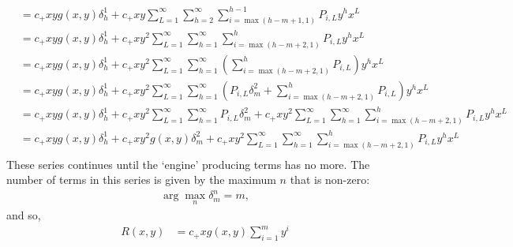 	\begin{align}
		&= c_+xy g(x, y)\delta_h^1 + c_+xy \sum_{L=1}^\infty\sum_{h=2}^\infty\sum_{i=\max(h-m+1, 1)}^{h-1} P_{i, L}y^hx^L\\
		&= c_+xy g(x, y)\delta_h^1 + c_+xy^2 \sum_{L=1}^\infty\sum_{h=1}^\infty\sum_{i=\max(h-m+2, 1)}^{h} P_{i, L}y^hx^L\\
		&= c_+xy g(x, y)\delta_h^1 + c_+xy^2 \sum_{L=1}^\infty\sum_{h=1}^\infty\left(\sum_{i=\max(h-m+2, 1)}^{h} P_{i, L}\right)y^hx^L\\
		&= c_+xy g(x, y)\delta_h^1 + c_+xy^2 \sum_{L=1}^\infty\sum_{h=1}^\infty\left(P_{i, L}\delta_m^2 + \sum_{i=\max(h-m+2, 1)}^{h} P_{i, L}\right)y^hx^L\\
		&= c_+xy g(x, y)\delta_h^1 + c_+xy^2 \sum_{L=1}^\infty\sum_{h=1}^\infty P_{i, L}\delta_m^2 + c_+xy^2 \sum_{L=1}^\infty\sum_{h=1}^\infty\sum_{i=\max(h-m+2, 1)}^{h} P_{i, L}y^hx^L\\
		&= c_+xy g(x, y)\delta_h^1 + c_+xy^2 g(x, y)\delta_m^2 + c_+xy^2 \sum_{L=1}^\infty\sum_{h=1}^\infty\sum_{i=\max(h-m+2, 1)}^{h} P_{i, L}y^hx^L\\
	\end{align}
	These series continues until the `engine' producing terms has no more. The number of terms in this series is given by the maximum $n$ that is non-zero:
	\begin{align}
		\arg \max_n \delta_m^n = m,
	\end{align}
	and so,
	\begin{align}
		R(x, y) &= c_+ x g(x, y)\sum_{i=1}^m y^i
	\end{align}
